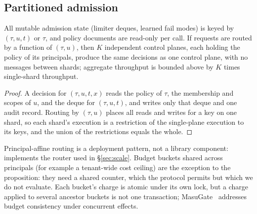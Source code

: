 \subsection{Partitioned admission}
\begin{proposition}
\label{prop:shard}
All mutable admission state (limiter deques, learned fail modes) is keyed by $(\tau,u,t)$ or $\tau$, and policy documents are read-only per call. If requests are routed by a function of $(\tau,u)$, then $K$ independent control planes, each holding the policy of its principals, produce the same decisions as one control plane, with no messages between shards; aggregate throughput is bounded above by $K$ times single-shard throughput.
\end{proposition}
\begin{proof}
A decision for $(\tau,u,t,x)$ reads the policy of $\tau$, the membership and scopes of $u$, and the deque for $(\tau,u,t)$, and writes only that deque and one audit record. Routing by $(\tau,u)$ places all reads and writes for a key on one shard, so each shard's execution is a restriction of the single-plane execution to its keys, and the union of the restrictions equals the whole.
\end{proof}
Principal-affine routing is a deployment pattern, not a library component:  implements the router used in \S\ref{sec:scale}. Budget buckets shared across principals (for example a tenant-wide cost ceiling) are the exception to the proposition: they need a shared counter, which the  protocol permits but which we do not evaluate. Each bucket's charge is atomic under its own lock, but a charge applied to several ancestor buckets is not one transaction; MasuGate~\cite{peng2026statefulgov} addresses budget consistency under concurrent effects.

